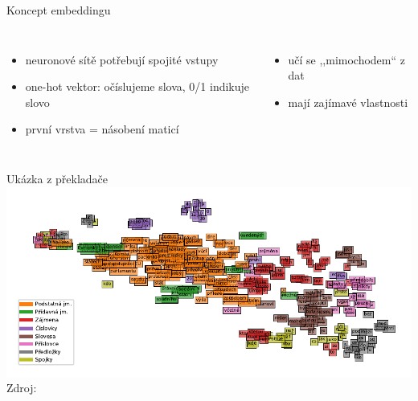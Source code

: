 \documentclass[aspectratio=169,dvipsnames]{beamer}
\begin{document}
\begin{frame}{Koncept embeddingu}

    \begin{columns}

    \begin{itemize}[<+->]

        \item neuronové sítě potřebují spojité vstupy

        \item one-hot vektor: očíslujeme slova, 0/1 indikuje slovo \\[1em]
            \scalebox{.9}{}

        \item první vrstva = násobení maticí

    \end{itemize}


        \vspace{15pt}

        \begin{itemize}

            \item<5-> učí se ,,mimochodem`` z dat

            \item<6-> mají zajímavé vlastnosti

        \end{itemize}

    \end{columns}

\end{frame}


\begin{frame}{Ukázka z překladače}
    \hspace*{-10pt}\includegraphics{./plots/tsne.pdf} \\
    \tiny Zdroj: \citet{rozhledy}
\end{frame}
\end{document}

